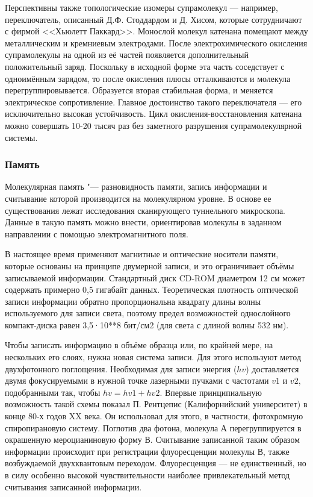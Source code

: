 \documentclass[titlepage, 12pt]{article}
\begin{document}
Перспективны также топологические изомеры супрамолекул — например, переключатель, описанный Д.Ф. Стоддардом и Д. Хисом, которые сотрудничают с фирмой <<Хьюлетт Паккард>>. Монослой молекул катенана помещают между металлическим и кремниевым электродами. После электрохимического окисления супрамолекулы на одной из её частей появляется дополнительный положительный заряд. Поскольку в исходной форме эта часть соседствует с одноимённым зарядом, то после окисления плюсы отталкиваются и молекула перегруппировывается. Образуется вторая стабильная форма, и меняется электрическое сопротивление. Главное достоинство такого переключателя — его исключительно высокая устойчивость. Цикл окисления-восстановления катенана можно совершать 10-20 тысяч раз без заметного разрушения супрамолекулярной системы.

\subsubsection{Память}
Молекулярная память "--- разновидность памяти, запись информации и считывание которой производится на молекулярном уровне.
В основе ее существования лежат исследования сканирующего туннельного микроскопа. Данные в такую память можно внести, ориентировав молекулы в заданном направлении с помощью электромагнитного поля.

В настоящее время применяют магнитные и оптические носители памяти, которые основаны на принципе двумерной записи, и это ограничивает объёмы записываемой информации. Стандартный диск CD-ROM диаметром 12 см может содержать примерно 0,5 гигабайт данных. Теоретическая плотность оптической записи информации обратно пропорциональна квадрату длины волны используемого для записи света, поэтому предел возможностей однослойного компакт-диска равен 3,5·10**8 бит/см2 (для света с длиной волны 532 нм).

Чтобы записать информацию в объёме образца или, по крайней мере, на нескольких его слоях, нужна новая система записи. Для этого используют метод двухфотонного поглощения. Необходимая для записи энергия ($hv$) доставляется двумя фокусируемыми в нужной точке лазерными пучками с частотами $v1$ и $v2$, подобранными так, чтобы $hv = hv1 + hv2$. Впервые принципиальную возможность такой схемы показал П. Рентцепис (Калифорнийский университет) в конце 80-х годов XX века. Он использовал для этого, в частности, фотохромную спиропирановую систему. Поглотив два фотона, молекула А перегруппируется в окрашенную мероцианиновую форму В. Считывание записанной таким образом информации происходит при регистрации флуоресценции молекулы В, также возбуждаемой двухквантовым переходом. Флуоресценция — не единственный, но в силу особенно высокой чувствительности наиболее привлекательный метод считывания записанной информации.
\end{document}
